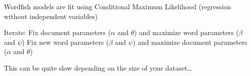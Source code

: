 \documentclass[kp]{foilpack}
\begin{document}




%


Wordfish models are fit using Conditional Maximum Likelihood (regression without independent variables)

Iterate:
\ita
\itm Fix document parameters ($\alpha$ and $\theta$) and maximize word parameters ($\beta$ and $\psi$)
\itm Fix new word parameters ($\beta$ and $\psi$) and maximize document parameters ($\alpha$ and $\theta$)
\itz

This can be quite slow depending on the size of your dataset\ldots



\end{document}
